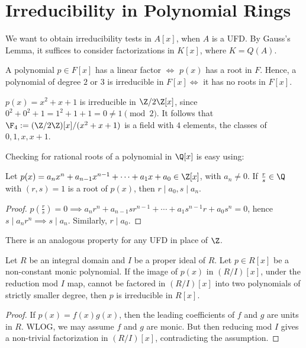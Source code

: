 \section{Irreducibility in Polynomial Rings}

We want to obtain irreducibility tests in $A[x]$, when $A$ is a UFD. By Gauss's Lemma, it suffices to consider factorizations in $K[x]$, where $K = Q(A)$.

\begin{prop}
    A polynomial $p \in F[x]$ has a linear factor $\iff$ $p(x)$ has a root in $F$. Hence, a polynomial of degree $2$ or $3$ is irreducible in $F[x] \iff$ it has no roots in $F[x]$.
\end{prop}

\begin{ex}
    $p(x) = x^2+x+1$ is irreducible in $\Z/2\Z [x]$, since $0^2+0^2+1=1^2+1+1=0 \neq 1 \pmod 2$. It follows that $\F_4 := (\Z/2\Z)[x] / (x^2+x+1)$ is a field with $4$ elements, the classes of $0,1,x,x+1$.
\end{ex}

Checking for rational roots of a polynomial in $\Q[x]$ is easy using:

\begin{prop}
    Let $p(x) = a_nx^n+a_{n-1}x^{n-1}+\cdots +a_1x+a_0 \in \Z[x]$, with $a_n \neq 0$. If $\frac{r}{s} \in \Q$ with $(r,s)=1$ is a root of $p(x)$, then $r \mid a_0,s \mid a_n$.
\end{prop}

\begin{proof}
    $p(\frac{r}{s})=0 \implies a_nr^n+a_{n-1}sr^{n-1}+\cdots + a_1s^{n-1}r+a_0s^n=0$, hence $s \mid a_nr^n \implies s \mid a_n$. Similarly, $r \mid a_0$.
\end{proof}

\begin{notebox*}
    There is an analogous property for any UFD in place of $\Z$.
\end{notebox*}

\begin{prop}
    Let $R$ be an integral domain and $I$ be a proper ideal of $R$. Let $p \in R[x]$ be a non-constant monic polynomial. If the image of $p(x)$ in $(R/I)[x]$, under the reduction mod $I$ map, cannot be factored in $(R/I)[x]$ into two polynomials of strictly smaller degree, then $p$ is irreducible in $R[x]$.
\end{prop}

\begin{proof}
    If $p(x) =f(x)g(x)$, then the leading coefficients of $f$ and $g$ are units in $R$. WLOG, we may assume $f$ and $g$ are monic. But then reducing mod $I$ gives a non-trivial factorization in $(R/I)[x]$, contradicting the assumption.
\end{proof}

